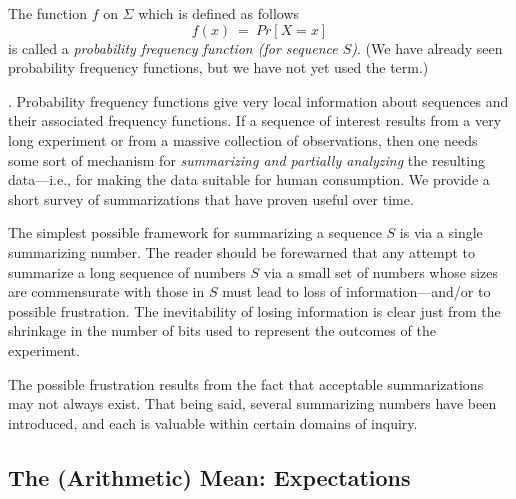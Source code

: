 \smallskip

The function $f$ on $\Sigma$ which is defined as follows
\[ f(x) \ = \ Pr[X=x] \]
is called a {\it probability frequency function (for sequence $S$)}.  (We have already seen probability frequency functions, but we have not yet used the term.)

\medskip

.
Probability frequency functions give very local information about sequences and their associated frequency functions.  If a sequence of interest results from a very long experiment or from a massive collection of observations, then one needs some sort of mechanism for {\em summarizing and partially analyzing} the resulting data---i.e., for making the data suitable for human consumption.  We provide a short survey of summarizations that have proven useful over time.

\medskip

The simplest possible framework for summarizing a sequence $S$ is via a single summarizing number. The reader should be forewarned that any attempt to summarize a long sequence of numbers $S$ via a small set of numbers whose sizes are commensurate with those in $S$ must lead to loss of information---and/or to possible frustration.  The inevitability of losing information is clear just from the shrinkage in the number of bits used to represent the outcomes of the experiment.

\bigskip

\noindent {}

\bigskip

\noindent
The possible frustration results from the fact that acceptable summarizations may not
always exist.   That being said, several summarizing numbers have been introduced, and
each is valuable within certain domains of inquiry. 

\subsection{The (Arithmetic) Mean: Expectations}
\label{sec:mean}

